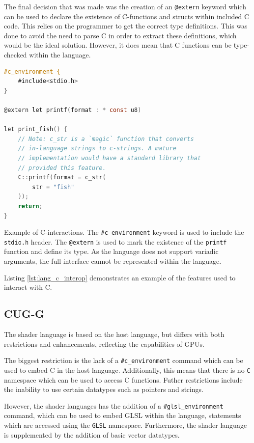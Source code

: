 \documentclass[a4paper,12pt,twoside,openright]{report}
\begin{document}
The final decision that was made was the creation of an \texttt{@extern}
keyword which can be used to declare the existence of C-functions and structs
within included C code. This relies on the programmer to get the correct type
definitions. This was done to avoid the need to parse C in order to extract
these definitions, which would be the ideal solution. However, it does mean
that C functions can be type-checked within the language.


\begin{lstfloat}
\begin{lstlisting}[language=C]
#c_environment {
    #include<stdio.h>
}

@extern let printf(format : * const u8)

let print_fish() {
    // Note: c_str is a `magic` function that converts
    // in-language strings to c-strings. A mature
    // implementation would have a standard library that
    // provided this feature.
    C::printf(format = c_str(
        str = "fish"
    ));
    return;
}
\end{lstlisting}
\caption{Example of C-interactions. The \texttt{\#c\_environment} keyword is
used to include the \texttt{stdio.h} header. The \texttt{@extern} is used to
mark the existence of the \texttt{printf} function and define its type. As the
language does not support variadic arguments, the full interface cannot be
represented within the language.}
\label{lst:lang_c_interop}
\end{lstfloat}

Listing \ref{lst:lang_c_interop} demonstrates an example of the features used
to interact with C.

\subsection{CUG-G}

The shader language is based on the host language, but differs with both
restrictions and enhancements, reflecting the capabilities of GPUs.

The biggest restriction is the lack of a \texttt{\#c\_environment} command
which can be used to embed C in the host language. Additionally, this means
that there is no \texttt{C} namespace which can be used to access C functions.
Futher restrictions include the inability to use certain datatypes such as
pointers and strings.

However, the shader languages has the addition of a
\texttt{\#glsl\_environment} command, which can be used to embed GLSL within
the language, statements which are accessed using the \texttt{GLSL} namespace.
Furthermore, the shader language is supplemented by the addition of basic
vector datatypes.
\end{document}
